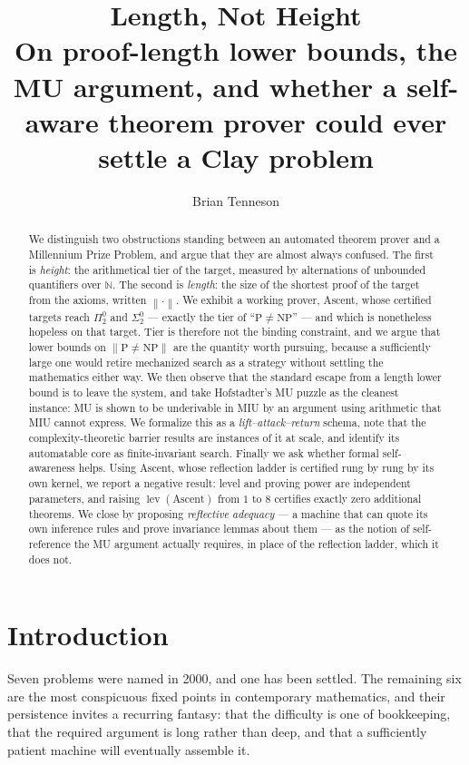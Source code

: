 \documentclass[11pt,a4paper]{article}
\title{\bfseries Length, Not Height\\[0.4em]
\large On proof-length lower bounds, the MU argument, and whether a
self-aware theorem prover could ever settle a Clay problem}
\author{Brian Tenneson}
\date{}
\newcommand{\Sig}[2]{\Sigma^{#1}_{#2}}
\newcommand{\Pai}[2]{\Pi^{#1}_{#2}}
\newcommand{\shortest}[1]{\left\lVert #1 \right\rVert}
\newcommand{\lev}{\operatorname{lev}}
\begin{document}
\maketitle

\begin{abstract}
\noindent
We distinguish two obstructions standing between an automated theorem prover
and a Millennium Prize Problem, and argue that they are almost always
confused. The first is \emph{height}: the arithmetical tier of the target,
measured by alternations of unbounded quantifiers over $\mathbb{N}$. The
second is \emph{length}: the size of the shortest proof of the target from
the axioms, written $\shortest{\cdot}$. We exhibit a working prover, Ascent,
whose certified targets reach $\Pai{0}{2}$ and $\Sig{0}{2}$ --- exactly the
tier of ``$\mathrm{P} \neq \mathrm{NP}$'' --- and which is nonetheless
hopeless on that target. Tier is therefore not the binding constraint, and we
argue that lower bounds on $\shortest{\mathrm{P} \neq \mathrm{NP}}$ are the
quantity worth pursuing, because a sufficiently large one would retire
mechanized search as a strategy without settling the mathematics either way.
We then observe that the standard escape from a length lower bound is to
leave the system, and take Hofstadter's MU puzzle as the cleanest instance:
MU is shown to be underivable in MIU by an argument using arithmetic that MIU
cannot express. We formalize this as a \emph{lift--attack--return} schema,
note that the complexity-theoretic barrier results are instances of it at
scale, and identify its automatable core as finite-invariant search. Finally
we ask whether formal self-awareness helps. Using Ascent, whose reflection
ladder is certified rung by rung by its own kernel, we report a negative
result: level and proving power are independent parameters, and raising
$\lev(\text{Ascent})$ from $1$ to $8$ certifies exactly zero additional
theorems. We close by proposing \emph{reflective adequacy} --- a machine that
can quote its own inference rules and prove invariance lemmas about them ---
as the notion of self-reference the MU argument actually requires, in place
of the reflection ladder, which it does not.
\end{abstract}

\section{Introduction}

Seven problems were named in 2000, and one has been settled. The remaining six
are the most conspicuous fixed points in contemporary mathematics, and their
persistence invites a recurring fantasy: that the difficulty is one of
bookkeeping, that the required argument is long rather than deep, and that a
sufficiently patient machine will eventually assemble it.
\end{document}
